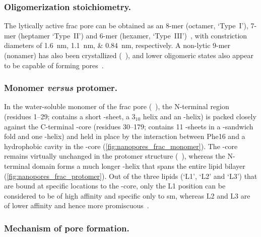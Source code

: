 %
\subsubsection{Oligomerization stoichiometry.}
%

The lytically active \gls{frac} pore can be obtained as an 8-mer (octamer, `Type~I'), 7-mer (heptamer
`Type~II') and 6-mer (hexamer, `Type~III')~\cite{Huang-2019}, with constriction diameters of
\SIlist{1.6;1.1;0.84}{\nm}, respectively. A non-lytic 9-mer (nonamer) has also been crystallized
(~\cite{Mechaly-2011}), and lower oligomeric states also appear to be capable of forming
pores~\cite{Rojko-2016}.

%
\subsubsection{Monomer \textit{versus} protomer.}
%

In the water-soluble monomer of the \gls{frac} pore (~\cite{Tanaka-2015}), the N-terminal region
(residues 1--29; contains a short \tb-sheet, a $3_{10}$ helix and an \ta-helix) is packed closely against the
C-terminal \tb-core (residues 30--179; contains 11 \tb-sheets in a \tb-sandwich fold and one \ta-helix) and
held in place by the interaction between Phe16 and a hydrophobic cavity in the \tb-core
(\cref{fig:nanopores_frac_monomer}). The \tb-core remains virtually unchanged in the protomer structure
(~\cite{Tanaka-2015}), whereas the N-terminal domain forms a much longer \ta-helix that spans the
entire lipid bilayer (\cref{fig:nanopores_frac_protomer}). Out of the three lipids (`L1', `L2' and `L3') that
are bound at specific locations to the \tb-core, only the L1 position can be considered to be of high affinity
and specific only to \gls{sm}, whereas L2 and L3 are of lower affinity and hence more
promiscuous~\cite{Tanaka-2015}. 

%
\subsubsection{Mechanism of pore formation.}
%


